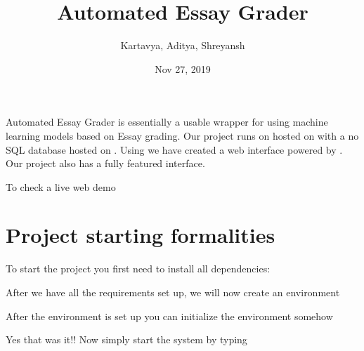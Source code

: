 \documentclass[letterpaper,10pt,english]{sphinxmanual}
\title{Automated Essay Grader}
\date{Nov 27, 2019}
\author{Kartavya, Aditya, Shreyansh}
\begin{document}
\pagestyle{empty}
\sphinxmaketitle
\pagestyle{plain}
\sphinxtableofcontents
\pagestyle{normal}
\label{\detokenize{index::doc}}


Automated Essay Grader is essentially a usable wrapper for using machine learning models based on Essay grading. Our project runs on  hosted on  with a no SQL database hosted on . Using  we have created a web interface powered by . Our project also has a fully featured  interface.

To check a live web demo 


\chapter{Project starting formalities}
\label{\detokenize{index:project-starting-formalities}}
To start the project you first need to install all dependencies:

\begin{sphinxVerbatim}[commandchars=\\\{\}]
  
\end{sphinxVerbatim}

After we have all the requirements set up, we will now create an environment

\begin{sphinxVerbatim}[commandchars=\\\{\}]
    
\end{sphinxVerbatim}

After the environment is set up you can initialize the environment somehow

\begin{sphinxVerbatim}[commandchars=\\\{\}]
  
\end{sphinxVerbatim}

Yes that was it!! Now simply start the system by typing
\end{document}
